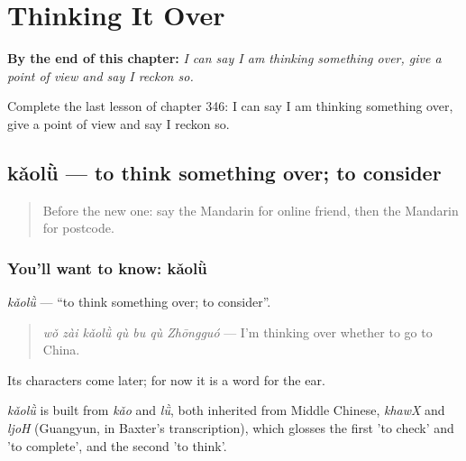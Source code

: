 
\chapter{Thinking It Over}
\label{ch:zh-thinking-it-over}

\begin{chapteropening}
\textbf{By the end of this chapter:} \emph{I can say I am thinking something over, give a point of view and say I reckon so.}

Complete the last lesson of chapter 346: I can say I am thinking something over, give a point of view and say I reckon so.
\end{chapteropening}

\section[kǎolǜ]{kǎolǜ — to think something over; to consider}

\label{lesson:ZH-C346-kaolu}



\begin{quote}
Before the new one: say the Mandarin for online friend, then the Mandarin for postcode.
\end{quote}

\subsection*{You'll want to know: kǎolǜ}
\emph{kǎolǜ} — \textquotedblleft{}to think something over; to consider\textquotedblright{}.

\begin{quote}
\emph{wǒ zài kǎolǜ qù bu qù Zhōngguó} — I'm thinking over whether to go to China.
\end{quote}

Its characters come later; for now it is a word for the ear.

\begin{cousinweb}
\emph{kǎolǜ} is built from \emph{kǎo} and \emph{lǜ}, both inherited from Middle Chinese, \emph{khawX} and \emph{ljoH} (Guangyun, in Baxter's transcription), which glosses the first 'to check' and 'to complete', and the second 'to think'.
\end{cousinweb}

